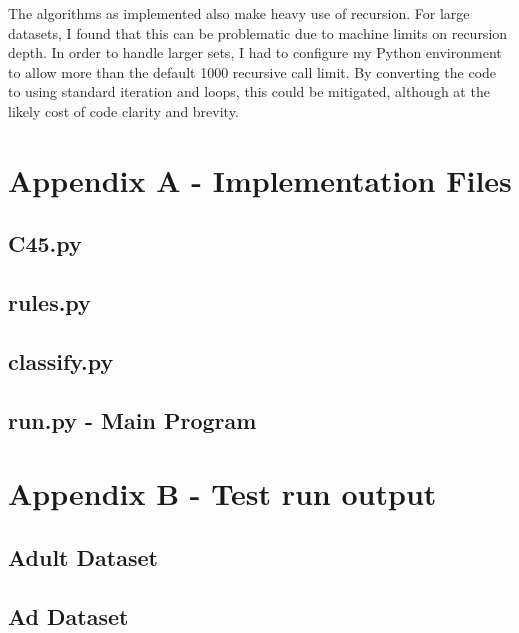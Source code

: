 \documentclass[letterpaper]{article}
\begin{document}
The algorithms as implemented also make heavy use of recursion. For large datasets, I found that this can be problematic due to machine limits on recursion depth. In order to handle larger sets, I had to configure my Python environment to allow more than the default 1000 recursive call limit. By converting the code to using standard iteration and loops, this could be mitigated, although at the likely cost of code clarity and brevity.

\onecolumn
\newpage
\section{Appendix A - Implementation Files}
\subsection{C45.py}

\subsection{rules.py}

\subsection{classify.py}

\subsection{run.py - Main Program}


\newpage
\section{Appendix B - Test run output}
\subsection{Adult Dataset}

\subsection{Ad Dataset}

\end{document}
